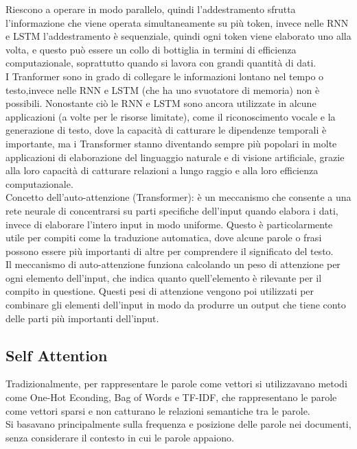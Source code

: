 Riescono a operare in modo parallelo, quindi l'addestramento sfrutta l'informazione che viene operata simultaneamente su più token, invece nelle RNN e LSTM l'addestramento è sequenziale, quindi ogni token viene elaborato uno alla volta, e questo può essere un collo di 
bottiglia in termini di efficienza computazionale, soprattutto quando si lavora con grandi quantità di dati.\\

I Tranformer sono in grado di collegare le informazioni lontano nel tempo o testo,invece nelle RNN e LSTM (che ha uno svuotatore di memoria) non è possibili.
Nonostante ciò le RNN e LSTM sono ancora utilizzate in alcune applicazioni (a volte per le risorse limitate), come il riconoscimento vocale e la generazione di testo, dove la capacità di catturare le dipendenze temporali è importante, 
ma i Transformer stanno diventando sempre più popolari in molte applicazioni di elaborazione del linguaggio naturale e di visione artificiale, grazie alla loro capacità di catturare relazioni a lungo raggio e alla loro efficienza computazionale.\\

Concetto dell'auto-attenzione (Transformer): è un meccanismo che consente a una rete neurale di concentrarsi su parti specifiche dell'input quando elabora i dati,
invece di elaborare l'intero input in modo uniforme. Questo è particolarmente utile per compiti come la traduzione automatica, dove alcune parole o frasi possono essere più importanti di altre per comprendere il significato del testo.\\
Il meccanismo di auto-attenzione funziona calcolando un peso di attenzione per ogni elemento dell'input, che indica quanto quell'elemento è rilevante per il compito in questione. Questi pesi di attenzione vengono poi utilizzati per combinare gli elementi
dell'input in modo da produrre un output che tiene conto delle parti più importanti dell'input.\\

\subsection{Self Attention}
Tradizionalmente, per rappresentare le parole come vettori si utilizzavano metodi come One-Hot Econding, Bag of Words e TF-IDF, che rappresentano le parole come vettori sparsi e non catturano le relazioni semantiche tra le parole.\\
Si basavano principalmente sulla frequenza e posizione delle parole nei documenti, senza considerare il contesto in cui le parole appaiono.\\

